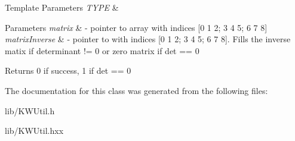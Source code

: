 \begin{DoxyTemplParams}{Template Parameters}
{\em T\-Y\-P\-E} & \\
\hline
\end{DoxyTemplParams}

\begin{DoxyParams}{Parameters}
{\em matrix} & -\/ pointer to array with indices \mbox{[}0 1 2; 3 4 5; 6 7 8\mbox{]} \\
\hline
{\em matrix\-Inverse} & -\/ pointer to with indices \mbox{[}0 1 2; 3 4 5; 6 7 8\mbox{]}. Fills the inverse matix if determinant != 0 or zero matrix if det == 0 \\
\hline
\end{DoxyParams}
\begin{DoxyReturn}{Returns}
0 if success, 1 if det == 0 
\end{DoxyReturn}


The documentation for this class was generated from the following files\-:\begin{DoxyCompactItemize}
\item 
lib/K\-W\-Util.\-h\item 
lib/K\-W\-Util.\-hxx\end{DoxyCompactItemize}
